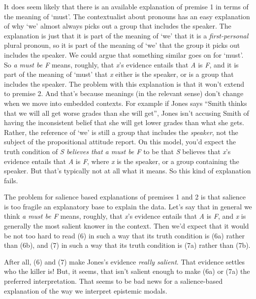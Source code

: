 \documentclass[
  11pt,
  letterpaper,
  DIV=11,
  numbers=noendperiod,
  twoside]{scrartcl}
\begin{document}
It does seem likely that there is an available explanation of premise 1
in terms of the meaning of `must'. The contextualist about pronouns has
an easy explanation of why `we' almost always picks out a group that
includes the speaker. The explanation is just that it is part of the
meaning of `we' that it is a \emph{first-personal} plural pronoun, so it
is part of the meaning of `we' that the group it picks out includes the
speaker. We could argue that something similar goes on for `must'. So
\emph{a must be F} means, roughly, that \emph{x}'s evidence entails that
\emph{A} is \emph{F}, and it is part of the meaning of `must' that
\emph{x} either is the speaker, or is a group that includes the speaker.
The problem with this explanation is that it won't extend to premise 2.
And that's because meanings (in the relevant sense) don't change when we
move into embedded contexts. For example if Jones says ``Smith thinks
that we will all get worse grades than she will get'', Jones isn't
accusing Smith of having the inconsistent belief that she will get lower
grades than what she gets. Rather, the reference of `we' is still a
group that includes the \emph{speaker}, not the subject of the
propositional attitude report. On this model, you'd expect the truth
condition of \emph{S believes that a must be F} to be that \emph{S}
believes that \emph{x}'s evidence entails that \emph{A} is \emph{F},
where \emph{x} is the speaker, or a group containing the speaker. But
that's typically not at all what it means. So this kind of explanation
fails.

The problem for salience based explanations of premises 1 and 2 is that
salience is too fragile an explanatory base to explain the data. Let's
say that in general we think \emph{a must be F} means, roughly, that
\emph{x}'s evidence entails that \emph{A} is \emph{F}, and \emph{x} is
generally the most salient knower in the context. Then we'd expect that
it would be not too hard to read (6) in such a way that its truth
condition is (6a) rather than (6b), and (7) in such a way that its truth
condition is (7a) rather than (7b).

After all, (6) and (7) make Jones's evidence \emph{really salient}. That
evidence settles who the killer is! But, it seems, that isn't salient
enough to make (6a) or (7a) the preferred interpretation. That seems to
be bad news for a salience-based explanation of the way we interpret
epistemic modals.
\end{document}
